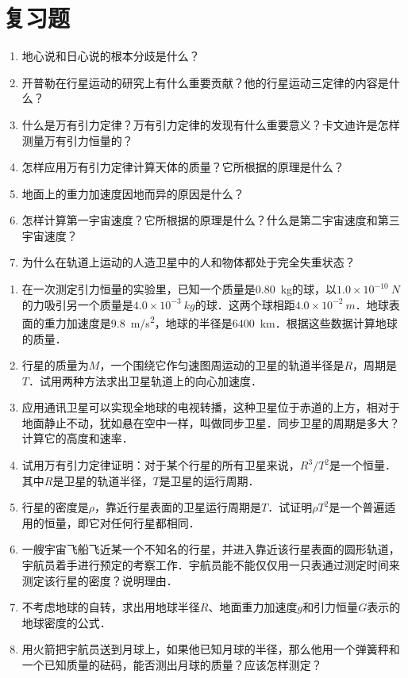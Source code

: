 \section*{复习题}
\begin{enumerate}
	\item 地心说和日心说的根本分歧是什么？
	\item 开普勒在行星运动的研究上有什么重要贡献？他的行星运动三定律的内容是什么？
	\item 什么是万有引力定律？万有引力定律的发现有什么重要意义？卡文迪许是怎样测量万有引力恒量的？
	\item 怎样应用万有引力定律计算天体的质量？它所根据的原理是什么？
	\item 地面上的重力加速度因地而异的原因是什么？
	\item 怎样计算第一宇宙速度？它所根据的原理是什么？什么是第二宇宙速度和第三宇宙速度？
	\item 为什么在轨道上运动的人造卫星中的人和物体都处于完全失重状态？
\end{enumerate}
\newpage
\begin{exercises}

\begin{enumerate}
	\item 在一次测定引力恒量的实验里，已知一个质量是\SI{0.80}{kg}的球，以$1.0\times 10^{-10}~\si{N}$的力吸引另一个质量是$4.0\times 10^{-3}~\si{kg}$的球．这两个球相距$4.0\times 10^{-2}~\si{m}$．地球表面的重力加速度是\SI{9.8}{m/s^2}，地球的半径是\SI{6400}{km}．根据这些数据计算地球的质量．
	\item 行星的质量为$M$，一个围绕它作匀速图周运动的卫星的轨道半径是$R$，周期是$T$．试用两种方法求出卫星轨道上的向心加速度．
	\item 应用通讯卫星可以实现全地球的电视转播，这种卫星位于赤道的上方，相对于地面静止不动，犹如悬在空中一样，叫做同步卫星．同步卫星的周期是多大？计算它的高度和速率．
	\item 试用万有引力定律证明：对于某个行星的所有卫星来说，$R^3/T^2$是一个恒量．其中$R$是卫星的轨道半径，$T$是卫星的运行周期．
	\item 行星的密度是$\rho$，靠近行星表面的卫星运行周期是$T$．试证明$\rho T^2$是一个普遍适用的恒量，即它对任何行星都相同．
	\item 一艘宇宙飞船飞近某一个不知名的行星，并进入靠近该行星表面的圆形轨道，宇航员着手进行预定的考察工作．宇航员能不能仅仅用一只表通过测定时间来测定该行星的密度？说明理由．
	\item 不考虑地球的自转，求出用地球半径$R$、地面重力加速度$g$和引力恒量$G$表示的地球密度的公式．
	\item 用火箭把宇航员送到月球上，如果他已知月球的半径，那么他用一个弹簧秤和一个已知质量的砝码，能否测出月球的质量？应该怎样测定？

\end{enumerate}
\end{exercises}

